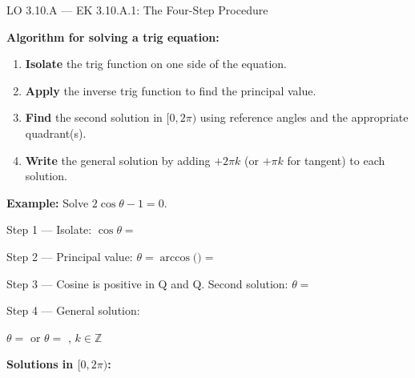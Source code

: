\documentclass[10pt]{article}
\begin{document}
\begin{notesbox}{LO 3.10.A --- EK 3.10.A.1: The Four-Step Procedure}

\textbf{Algorithm for solving a trig equation:}
\begin{enumerate}[leftmargin=1.5em, itemsep=4pt]
  \item \textbf{Isolate} the trig function on one side of the equation.
  \item \textbf{Apply} the inverse trig function to find the principal value.
  \item \textbf{Find} the second solution in $[0, 2\pi)$ using reference angles
    and the appropriate quadrant(s).
  \item \textbf{Write} the general solution by adding $+2\pi k$ (or $+\pi k$
    for tangent) to each solution.
\end{enumerate}

\vspace{6pt}
\textbf{Example:} Solve $2\cos\theta - 1 = 0$.

\vspace{4pt}
Step 1 --- Isolate: $\cos\theta = $ 

\vspace{4pt}
Step 2 --- Principal value: $\theta = \arccos\!\bigl($$\bigr) = $ 

\vspace{4pt}
Step 3 --- Cosine is positive in Q and Q.
Second solution: $\theta = $ 

\vspace{4pt}
Step 4 --- General solution:

$\theta = $  or $\theta = $ ,
$k \in \mathbb{Z}$

\vspace{6pt}
\textbf{Solutions in $[0, 2\pi)$:}

\end{notesbox}

\vspace{0.06in}
\end{document}

